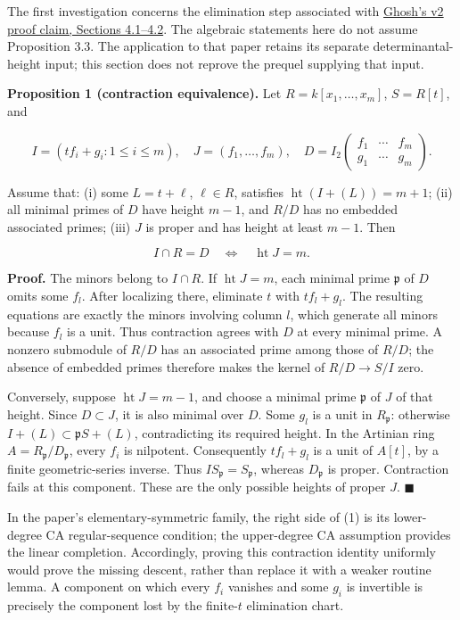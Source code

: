 \documentclass[
  british,
  10pt,
]{article}
\begin{document}
The first investigation concerns the elimination step associated with
\href{https://arxiv.org/html/2501.09272v2}{Ghosh's v2 proof claim,
Sections 4.1--4.2}. The algebraic statements here do not assume
Proposition 3.3. The application to that paper retains its separate
determinantal-height input; this section does not reprove the prequel
supplying that input.

\textbf{Proposition 1 (contraction equivalence).} Let
\(R=k[x_1,\ldots,x_m]\), \(S=R[t]\), and

\[
 I=(tf_i+g_i:1\le i\le m),\quad J=(f_1,\ldots,f_m),
 \quad D=I_2\begin{pmatrix}f_1&\cdots&f_m\\g_1&\cdots&g_m\end{pmatrix}.
\]

Assume that: (i) some \(L=t+\ell\), \(\ell\in R\), satisfies
\(\operatorname{ht}(I+(L))=m+1\); (ii) all minimal primes of \(D\) have
height \(m-1\), and \(R/D\) has no embedded associated primes; (iii)
\(J\) is proper and has height at least \(m-1\). Then

\[
             I\cap R=D\quad\Longleftrightarrow\quad
             \operatorname{ht}J=m.                         \tag{1}
\]

\textbf{Proof.} The minors belong to \(I\cap R\). If
\(\operatorname{ht}J=m\), each minimal prime \(\mathfrak p\) of \(D\)
omits some \(f_l\). After localizing there, eliminate \(t\) with
\(tf_l+g_l\). The resulting equations are exactly the minors involving
column \(l\), which generate all minors because \(f_l\) is a unit. Thus
contraction agrees with \(D\) at every minimal prime. A nonzero
submodule of \(R/D\) has an associated prime among those of \(R/D\); the
absence of embedded primes therefore makes the kernel of
\(R/D\longrightarrow S/I\) zero.

Conversely, suppose \(\operatorname{ht}J=m-1\), and choose a minimal
prime \(\mathfrak p\) of \(J\) of that height. Since \(D\subset J\), it
is also minimal over \(D\). Some \(g_l\) is a unit in
\(R_{\mathfrak p}\): otherwise \(I+(L)\subset\mathfrak pS+(L)\),
contradicting its required height. In the Artinian ring
\(A=R_{\mathfrak p}/D_{\mathfrak p}\), every \(f_i\) is nilpotent.
Consequently \(tf_l+g_l\) is a unit of \(A[t]\), by a finite
geometric-series inverse. Thus \(IS_{\mathfrak p}=S_{\mathfrak p}\),
whereas \(D_{\mathfrak p}\) is proper. Contraction fails at this
component. These are the only possible heights of proper \(J\).
\(\blacksquare\)

In the paper's elementary-symmetric family, the right side of (1) is its
lower-degree CA regular-sequence condition; the upper-degree CA
assumption provides the linear completion. Accordingly, proving this
contraction identity uniformly would prove the missing descent, rather
than replace it with a weaker routine lemma. A component on which every
\(f_i\) vanishes and some \(g_i\) is invertible is precisely the
component lost by the finite-\(t\) elimination chart.
\end{document}
